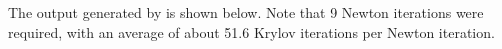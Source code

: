 The output generated by  is shown below.  Note that 9 Newton
iterations were required, with an average of about 51.6 Krylov iterations
per Newton iteration.



